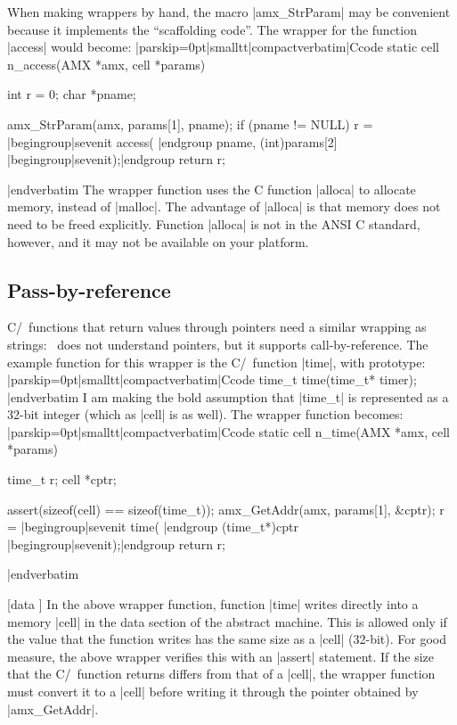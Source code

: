 When making wrappers by hand, the macro |amx_StrParam| may be convenient because
it implements the ``scaffolding code''. The wrapper for the function |access| would
become:
\listingx\verbatim|parskip=0pt|smalltt|compactverbatim|Ccode
static cell n_access(AMX *amx, cell *params)
{
  int r = 0;
  char *pname;

  amx_StrParam(amx, params[1], pname);
  if (pname != NULL)
    r = |begingroup|sevenit access( |endgroup pname, (int)params[2] |begingroup|sevenit);|endgroup
  return r;
}
|endverbatim\endlistingx
{} 
The wrapper function uses the C function |alloca| to allocate memory, instead of
|malloc|. The advantage of |alloca| is that memory does not need to be freed
explicitly. Function |alloca| is not in the ANSI C standard, however, and it may
not be available on your platform.

\subsection{Pass-by-reference}
C/\Cpp\ functions that return values through pointers need a similar wrapping as
strings: \Small\ does not understand pointers, but it supports call-by-reference.
The example function for this wrapper is the C/\Cpp\ function |time|, with prototype:
\goodbreak
\listingx\verbatim|parskip=0pt|smalltt|compactverbatim|Ccode
time_t time(time_t* timer);
|endverbatim\endlistingx
I am making the bold assumption that |time_t| is represented as a 32-bit integer
(which as |cell| is as well). The wrapper function becomes:
\goodbreak
\listingx\verbatim|parskip=0pt|smalltt|compactverbatim|Ccode
static cell n_time(AMX *amx, cell *params)
{
  time_t r;
  cell *cptr;

  assert(sizeof(cell) == sizeof(time_t));
  amx_GetAddr(amx, params[1], &cptr);
  r = |begingroup|sevenit time( |endgroup (time_t*)cptr |begingroup|sevenit);|endgroup
  return r;
}
|endverbatim\endlistingx

 [data \midtilde]
In the above wrapper function, function |time| writes directly into a memory |cell|
in the data section of the abstract machine. This is allowed only if the value
that the function writes has the same size as a |cell| (32-bit). For good measure,
the above wrapper verifies this with an |assert| statement. If the size that the
C/\Cpp\ function returns differs from that of a |cell|, the wrapper function
must convert it to a |cell| before writing it through the pointer obtained by
|amx_GetAddr|.

